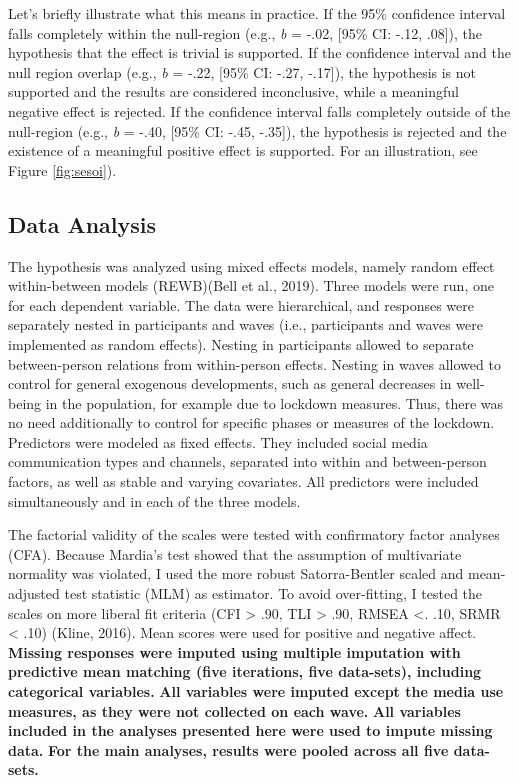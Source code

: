 \documentclass[
  man,mask]{apa7}
\begin{document}
Let's briefly illustrate what this means in practice.
If the 95\% confidence interval falls completely within the null-region (e.g., \emph{b} = -.02, {[}95\% CI: -.12, .08{]}), the hypothesis that the effect is trivial is supported.
If the confidence interval and the null region overlap (e.g., \emph{b} = -.22, {[}95\% CI: -.27, -.17{]}), the hypothesis is not supported and the results are considered inconclusive, while a meaningful negative effect is rejected.
If the confidence interval falls completely outside of the null-region (e.g., \emph{b} = -.40, {[}95\% CI: -.45, -.35{]}), the hypothesis is rejected and the existence of a meaningful positive effect is supported.
For an illustration, see Figure \ref{fig:sesoi}).

\hypertarget{data-analysis}{%
\subsection{Data Analysis}\label{data-analysis}}

The hypothesis was analyzed using mixed effects models, namely random effect within-between models (REWB)(Bell et al., 2019).
Three models were run, one for each dependent variable.
The data were hierarchical, and responses were separately nested in participants and waves (i.e., participants and waves were implemented as random effects).
Nesting in participants allowed to separate between-person relations from within-person effects.
Nesting in waves allowed to control for general exogenous developments, such as general decreases in well-being in the population, for example due to lockdown measures.
Thus, there was no need additionally to control for specific phases or measures of the lockdown.
Predictors were modeled as fixed effects.
They included social media communication types and channels, separated into within and between-person factors, as well as stable and varying covariates.
All predictors were included simultaneously and in each of the three models.

The factorial validity of the scales were tested with confirmatory factor analyses (CFA).
Because Mardia's test showed that the assumption of multivariate normality was violated, I used the more robust Satorra-Bentler scaled and mean-adjusted test statistic (MLM) as estimator.
To avoid over-fitting, I tested the scales on more liberal fit criteria (CFI \textgreater{} .90, TLI \textgreater{} .90, RMSEA \textless. .10, SRMR \textless{} .10) (Kline, 2016).
Mean scores were used for positive and negative affect.
\textbf{Missing responses were imputed using multiple imputation with predictive mean matching (five iterations, five data-sets), including categorical variables.}
\textbf{All variables were imputed except the media use measures, as they were not collected on each wave.}
\textbf{All variables included in the analyses presented here were used to impute missing data.}
\textbf{For the main analyses, results were pooled across all five data-sets.}
\end{document}
